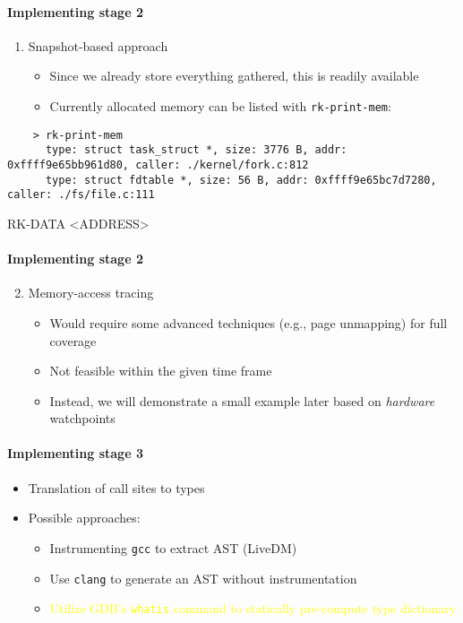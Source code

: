 \documentclass{i20lecture}
\begin{document}
\begin{frame}[fragile]{\insertsection}
  \framesubtitle{Implementing stage 2}

    \begin{enumerate}
     \item Snapshot-based approach
\pause
     \begin{itemize}
      \item Since we already store everything gathered, this is readily available
\pause
      \item Currently allocated memory can be listed with \lstinline|rk-print-mem|:
     \end{itemize}
    \end{enumerate}
    \begin{lstlisting}
    > rk-print-mem
      type: struct task_struct *, size: 3776 B, addr: 0xffff9e65bb961d80, caller: ./kernel/fork.c:812
      type: struct fdtable *, size: 56 B, addr: 0xffff9e65bc7d7280, caller: ./fs/file.c:111
    \end{lstlisting}
	RK-DATA <ADDRESS>
\end{frame}

\begin{frame}[fragile]{\insertsection}
  \framesubtitle{Implementing stage 2}

    \begin{enumerate}
     \setcounter{enumi}{1}
     \item Memory-access tracing
\pause
    \begin{itemize}
     \item Would require some advanced techniques (e.g., page unmapping) for full coverage
\pause
    \item Not feasible within the given time frame
\pause
    \item Instead, we will demonstrate a small example later based on \textit{hardware} watchpoints
    \end{itemize}
    \end{enumerate}
\end{frame}

\begin{frame}[fragile]{\insertsection}
  \framesubtitle{Implementing stage 3}
    \begin{itemize}
     \item Translation of call sites to types
	 \pause
     \item Possible approaches:
     \begin{itemize}
\pause
      \item Instrumenting \texttt{gcc} to extract AST (LiveDM)
\pause
      \item Use \texttt{clang} to generate an AST without instrumentation
\pause
	  \item \textcolor{yellow}{Utilize GDB's \texttt{whatis} command to statically pre-compute type dictionary}
     \end{itemize}
    \end{itemize}
\end{frame}
\end{document}
